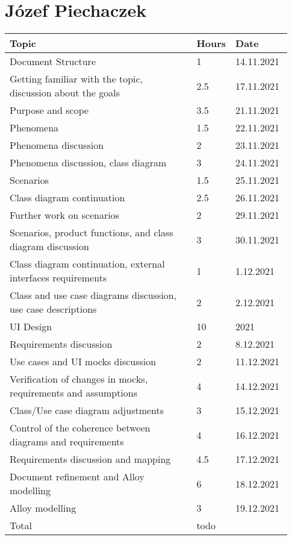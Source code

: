 \section*{Józef Piechaczek}
\begin{longtable}{@{}p{0.67\linewidth} p{0.06\linewidth} p{0.20\linewidth}@{}}
    \toprule[1.5pt]
    Topic &  Hours & Date \\ \hline
    Document Structure & 1 & 14.11.2021 \\ 
    Getting familiar with the topic, discussion about the goals & 2.5 & 17.11.2021 \\ 
    Purpose and scope & 3.5 & 21.11.2021 \\ 
    Phenomena & 1.5 & 22.11.2021 \\ 
    Phenomena discussion & 2 & 23.11.2021 \\
    Phenomena discussion, class diagram & 3 & 24.11.2021 \\ 
    Scenarios & 1.5 & 25.11.2021 \\
    Class diagram continuation & 2.5 & 26.11.2021 \\ 
    Further work on scenarios & 2 & 29.11.2021 \\
    Scenarios, product functions, and class diagram discussion & 3 & 30.11.2021\\ 
    Class diagram continuation, external interfaces requirements & 1 & 1.12.2021\\
    Class and use case diagrams discussion, use case descriptions & 2 & 2.12.2021\\
    UI Design & 10 & 2021\\ 
    Requirements discussion & 2 & 8.12.2021\\
    Use cases and UI mocks discussion & 2 & 11.12.2021\\
    Verification of changes in mocks, requirements and assumptions & 4 & 14.12.2021\\
    Class/Use case diagram adjustments & 3 & 15.12.2021\\
    Control of the coherence between diagrams and requirements & 4 & 16.12.2021\\
    Requirements discussion and mapping & 4.5 & 17.12.2021\\
    Document refinement and Alloy modelling & 6 & 18.12.2021\\
    Alloy modelling & 3 & 19.12.2021\\
    \hline
    Total &  todo & \\
    \bottomrule[1.5pt]
\end{longtable}

